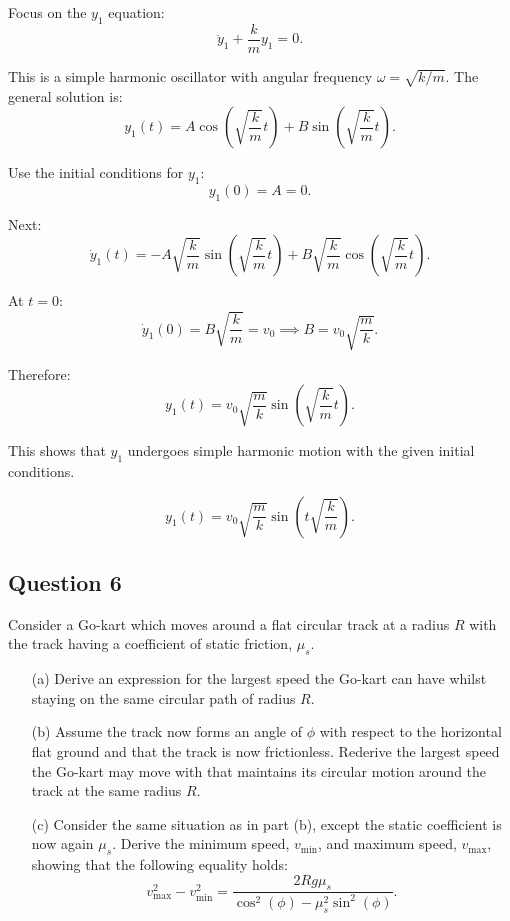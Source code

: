 \documentclass{article}
\begin{document}
Focus on the \( y_1 \) equation:
\[
\ddot{y}_1 + \frac{k}{m} y_1 = 0.
\]

This is a simple harmonic oscillator with angular frequency \(\omega = \sqrt{k/m}\). The general solution is:
\[
y_1(t) = A \cos\left(\sqrt{\frac{k}{m}} t\right) + B \sin\left(\sqrt{\frac{k}{m}} t\right).
\]

Use the initial conditions for \( y_1 \):
\[
y_1(0) = A = 0.
\]

Next:
\[
\dot{y}_1(t) = -A \sqrt{\frac{k}{m}} \sin\left(\sqrt{\frac{k}{m}} t\right) + B \sqrt{\frac{k}{m}} \cos\left(\sqrt{\frac{k}{m}} t\right).
\]

At \( t=0 \):
\[
\dot{y}_1(0) = B \sqrt{\frac{k}{m}} = v_0 \implies B = v_0 \sqrt{\frac{m}{k}}.
\]

Therefore:
\[
y_1(t) = v_0 \sqrt{\frac{m}{k}} \sin\left(\sqrt{\frac{k}{m}} t\right).
\]

This shows that \( y_1 \) undergoes simple harmonic motion with the given initial conditions.

\[
\boxed{y_1(t) = v_0 \sqrt{\frac{m}{k}} \sin\left(t \sqrt{\frac{k}{m}}\right).}
\]

\subsection{Question 6}

Consider a Go-kart which moves around a flat circular track at a radius $R$ with the track having a coefficient of static friction, $\mu_s$.

\begin{enumerate}
    \item[(a)] Derive an expression for the largest speed the Go-kart can have whilst staying on the same circular path of radius $R$.
    
    \item[(b)] Assume the track now forms an angle of $\phi$ with respect to the horizontal flat ground and that the track is now frictionless. Rederive the largest speed the Go-kart may move with that maintains its circular motion around the track at the same radius $R$.
    
    \item[(c)] Consider the same situation as in part (b), except the static coefficient is now again $\mu_s$. Derive the minimum speed, $v_{\text{min}}$, and maximum speed, $v_{\text{max}}$, showing that the following equality holds:
    \[
    v^2_{\text{max}} - v^2_{\text{min}} = \frac{2R g \mu_s}{\cos^2(\phi) - \mu_s^2 \sin^2(\phi)}.
    \]
    
\end{enumerate}
\end{document}
